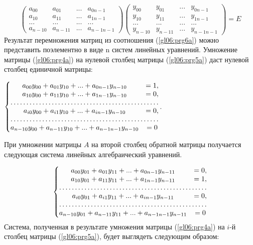 \noindent\begin{equation}\label{gl06:prg6a}
\left(\begin{matrix}a_{00}&a_{01}&...&a_{0n-1}\\a_{10}&a_{11}&...&a_{1n-1}\\...&...&...&...\\a_{n-10}&a_{n-11}&...&a_{n-1n-1}\end{matrix}\right)\left(\begin{matrix}y_{00}&y_{01}&...&y_{0n-1}\\y_{10}&y_{11}&...&y_{1n-1}\\...&...&...&...\\y_{n-10}&y_{n-11}&...&y_{n-1n-1}\end{matrix}\right)=E
\end{equation}
Результат перемножения матриц из соотношения (\ref{gl06:prg6a}) можно представить поэлементно в виде n систем линейных
уравнений. Умножение матрицы (\ref{gl06:prg4a}) на нулевой столбец матрицы (\ref{gl06:prg5a}) даст нулевой столбец
единичной матрицы:

$\left\{\begin{matrix}
a_{00}y_{00}+a_{01}y_{10}+...+a_{0n-1}y_{n-10}&=1,\\
a_{10}y_{00}+a_{11}y_{10}+...+a_{1n-1}y_{n-10}&=0,\\
\hdotsfor{2}\\
a_{i0}y_{00}+a_{i1}y_{10}+...+a_{in-1}y_{n-10}&=0,\\
\hdotsfor{2}\\
a_{n-10}y_{00}+a_{n-11}y_{10}+...+a_{n-1n-1}y_{n-10}&=0
\end{matrix}\right.$.

При умножении матрицы $A$ на второй столбец обратной матрицы получается следующая система линейных алгебраический
уравнений.

\begin{equation*}
\left\{\begin{matrix}
a_{00}y_{01}+a_{01}y_{11}+...+a_{0n-1}y_{n-11}&=0,\\
a_{10}y_{01}+a_{11}y_{11}+...+a_{1n-1}y_{n-11}&=1,\\
\hdotsfor{2}\\
a_{i0}y_{01}+a_{i1}y_{11}+...+a_{in-1}y_{n-11}&=0,\\
\hdotsfor{2}\\
a_{n-10}y_{01}+a_{n-11}y_{11}+...+a_{n-1n-1}y_{n-11}&=0
\end{matrix}\right.
\end{equation*}
Система, полученная в результате умножения матрицы (\ref{gl06:prg4a}) на $i$-й столбец матрицы
(\ref{gl06:prg5a}), будет выглядеть следующим образом:


